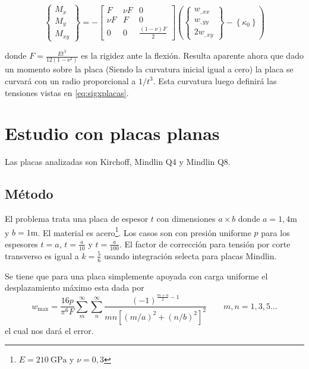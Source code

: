 \documentclass[onecolumn,10pt,titlepage]{article}
\begin{document}
\begin{equation} \label{eq:constitutive}
\left\{\begin{array}{l}{M_{x}} \\ {M_{y}} \\ {M_{x y}}\end{array}\right\} =- \left[ \begin{array}{ccc}{F} & {\nu F} & {0} \\ {\nu F} & {F} & {0} \\ {0} & {0} & {\frac{(1-\nu) F}{2}}\end{array}\right] \left(\left\{\begin{array}{l}{w_{,x x}} \\ {w_{,y y}} \\ {2 w_{,x y}}\end{array}\right\}-\left\{\kappa_{0}\right\} \right)
\end{equation}

donde $F=\frac{E t^{3}}{12\left(1-\nu^{2}\right)}$ es la rigidez ante la flexión. Resulta aparente ahora que dado un momento sobre la placa (Siendo la curvatura inicial igual a cero) la placa se curvará con un radio proporcional a $1/t^3$. Esta curvatura luego definirá las tensiones vistas en \eqref{eq:sigxplacas}. 

\section{Estudio con placas planas}
Las placas analizadas son Kirchoff, Mindlin Q4 y Mindlin Q8.

\subsection{Método}
El problema trata una placa de espesor $t$ con dimensiones $a\times b$ donde $a=1,4\si{\meter}$ y $b=1\si{\meter}$. El material es acero\footnote{$E=\SI{210}{\giga \pascal}$ y $\nu=0,3$}. Los casos son con presión uniforme $p$ para los espesores $t=a$, $t=\frac{a}{10}$ y $t=\frac{a}{100}$. El factor de corrección para tensión por corte transverso es igual a $k=\frac{5}{6}$ usando integración selecta\citep{cook2007concepts} para placas Mindlin.

Se tiene que para una placa simplemente apoyada con carga uniforme el desplazamiento máximo esta dada por \citep{ugural2003advanced}
\begin{equation}\label{eq:uguralwmax}
w_{\max }=\frac{16 p}{\pi^{6} F} \sum_{m}^{\infty} \sum_{n}^{\infty} \frac{(-1)^{\frac{m+n}{2}-1}}{m n\left[(m / a)^{2}+(n / b)^{2}\right]^{2}}\qquad m,n = 1,3,5 \ldots
\end{equation}
el cual nos dará el error.
\end{document}
